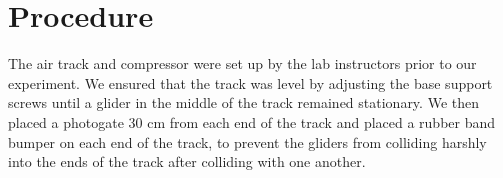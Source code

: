 \section*{Procedure}

\noindent
The air track and compressor were set up by the lab instructors prior to
our experiment. We ensured that the track was level by adjusting the base
support screws until a glider in the middle of the track remained stationary.
We then placed a photogate 30 cm from each end of the track and placed a 
rubber band bumper on each end of the track, to prevent the gliders from
colliding harshly into the ends of the track after colliding with one another.
